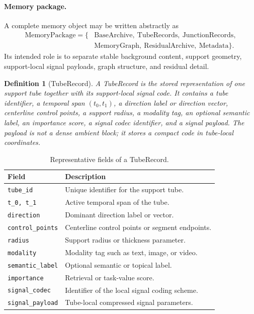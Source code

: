 \documentclass[11pt]{article}
\newtheorem{definition}{Definition}
\begin{document}
\paragraph{Memory package.}
A complete memory object may be written abstractly as
\begin{equation}
\begin{aligned}
\mathrm{MemoryPackage}
=
\{&\mathrm{BaseArchive},\ \mathrm{TubeRecords},\ \mathrm{JunctionRecords},\\
&\mathrm{MemoryGraph},\ \mathrm{ResidualArchive},\ \mathrm{Metadata}\}.
\end{aligned}
\end{equation}
Its intended role is to separate stable background content, support geometry, support-local signal payloads, graph structure, and residual detail.

\begin{definition}[TubeRecord]
A \emph{TubeRecord} is the stored representation of one support tube together with its support-local signal code. It contains a tube identifier, a temporal span $(t_0,t_1)$, a direction label or direction vector, centerline control points, a support radius, a modality tag, an optional semantic label, an importance score, a signal codec identifier, and a signal payload. The payload is not a dense ambient block; it stores a compact code in tube-local coordinates.
\end{definition}

\begin{table}[h]
\centering
\caption{Representative fields of a TubeRecord.}
\label{tab:tuberecord-fields}
\begin{tabular}{>{\raggedright\arraybackslash}p{} >{\raggedright\arraybackslash}p{}}
\toprule
Field & Description \\
\midrule
\texttt{tube\_id} & Unique identifier for the support tube. \\
\texttt{t\_0, t\_1} & Active temporal span of the tube. \\
\texttt{direction} & Dominant direction label or vector. \\
\texttt{control\_points} & Centerline control points or segment endpoints. \\
\texttt{radius} & Support radius or thickness parameter. \\
\texttt{modality} & Modality tag such as text, image, or video. \\
\texttt{semantic\_label} & Optional semantic or topical label. \\
\texttt{importance} & Retrieval or task-value score. \\
\texttt{signal\_codec} & Identifier of the local signal coding scheme. \\
\texttt{signal\_payload} & Tube-local compressed signal parameters. \\
\bottomrule
\end{tabular}
\end{table}
\end{document}
